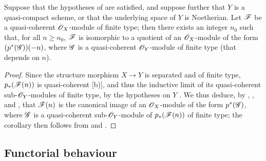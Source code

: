 \begin{corollary}[3.4.8]
\label{II.3.4.8}
Suppose that the hypotheses of  are satisfied, and suppose further that $Y$ is a quasi-compact scheme, or that the underlying space of $Y$ is Noetherian.
Let $\mathscr{F}$ be a quasi-coherent $\mathscr{O}_X$-module of finite type;
then there exists an integer $n_0$ such that, for all $n\geq n_0$, $\mathscr{F}$ is isomorphic to a quotient of an $\mathscr{O}_X$-module of the form $(p^*(\mathscr{G}))(-n)$, where $\mathscr{G}$ is a quasi-coherent $\mathscr{O}_Y$-module of finite type (that depends on $n$).
\end{corollary}

\begin{proof}
Since the structure morphism $X\to Y$ is separated and of finite type, $p_*(\mathscr{F}(n))$ is quasi-coherent [b)], and thus the inductive limit of its quasi-coherent sub-$\mathscr{O}_Y$-modules of finite type, by the hypotheses on $Y$ .
We thus deduce, by , , and , that $\mathscr{F}(n)$ is the canonical image of an $\mathscr{O}_X$-module of the form $p^*(\mathscr{G})$, where $\mathscr{G}$ is a quasi-coherent sub-$\mathscr{O}_Y$-module of $p_*(\mathscr{F}(n))$ of finite type;
the corollary then follows from  and .
\end{proof}


\subsection{Functorial behaviour}
\label{subsection:II.3.5}

